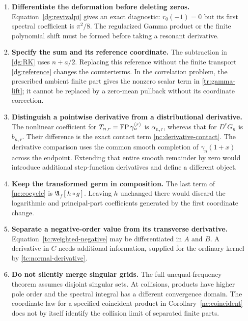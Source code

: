 \begin{enumerate}
\item \textbf{Differentiate the deformation before deleting zeros.}
Equation~\eqref{dg:revivalpi} gives an exact diagnostic:
$r_0(-1)=0$ but its first spectral coefficient is $\pi^2/8$.
The regularized Gamma product or the finite polynomial shift must be
formed before taking a resonant derivative.

\item \textbf{Specify the sum and its reference coordinate.}
The subtraction in \eqref{dg:RK} uses $n+a/2$. Replacing this reference
without the finite transport \eqref{dg:reference} changes the
counterterms. In the correlation problem, the prescribed ambient
finite part gives the nonzero scalar term in
\eqref{tr:gamma-lift}; it cannot be replaced by a
zero-mean pullback without its coordinate correction.

\item \textbf{Distinguish a pointwise derivative from a distributional
derivative.} The nonlinear coefficient for
$T_{n,r}=\operatorname{FP}\gamma_n^{(r)}$ is $\alpha_{n,r}$, whereas that for
$D^rG_n$ is $b_{n,r}$. Their difference is the exact contact term
\eqref{nc:derivative-contact}. The derivative comparison uses the
common smooth completion of $\gamma_n(1+x)$ across the endpoint.
Extending that entire smooth remainder by zero would introduce
additional step-function derivatives and define a different object.

\item \textbf{Keep the transformed germ in composition.}
The last term of \eqref{nc:cocycle} is
$\mathfrak A_f[h\circ g]$. Leaving $h$ unchanged there would
discard the logarithmic and principal-part coefficients generated
by the first coordinate change.

\item \textbf{Separate a negative-order value from its transverse
derivative.} Equation~\eqref{tc:weighted-negative} may be
differentiated in $A$ and $B$. A derivative in $C$ needs additional
information, supplied for the ordinary kernel by
\eqref{tc:normal-derivative}.

\item \textbf{Do not silently merge singular grids.}
The full unequal-frequency theorem assumes disjoint singular sets.
At collisions, products have higher pole order and the spectral
integral has a different convergence domain. The coordinate law for
a specified coincident product in Corollary~\ref{nc:coincident}
does not by itself identify the collision limit of separated
finite parts.
\end{enumerate}

